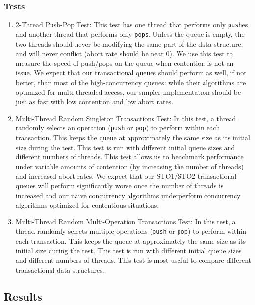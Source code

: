 \subsubsection{Tests}
\begin{enumerate}
\item 2-Thread Push-Pop Test: This test has one thread that performs only \texttt{push}es and another thread that performs only \texttt{pops}. Unless the queue is empty, the two threads should never be modifying the same part of the data structure, and will never conflict (abort rate should be near 0). We use this test to measure the speed of push/pops on the queue when contention is not an issue. We expect that our transactional queues should perform as well, if not better, than most of the high-concurrency queues: while their algorithms are optimized for multi-threaded access, our simpler implementation should be just as fast with low contention and low abort rates.

\item Multi-Thread Random Singleton Transactions Test: 
    In this test, a thread randomly selects an operation (\texttt{push} or \texttt{pop}) to perform within each transaction. This keeps the queue at approximately the same size as its initial size during the test. This test is run with different initial queue sizes and different numbers of threads. This test allows us to benchmark performance under variable amounts of contention (by increasing the number of threads) and increased abort rates. We expect that our STO1/STO2 transactional queues will perform significantly worse once the number of threads is increased and our naive concurrency algorithms underperform concurrency algorithms optimized for contentious situations.
    
\item Multi-Thread Random Multi-Operation Transactions Test: 
    In this test, a thread randomly selects multiple operations (\texttt{push} or \texttt{pop}) to perform within each transaction. This keeps the queue at approximately the same size as its initial size during the test. This test is run with different initial queue sizes and different numbers of threads. This test is most useful to compare different transactional data structures.
    
\end{enumerate}

\subsection{Results}

